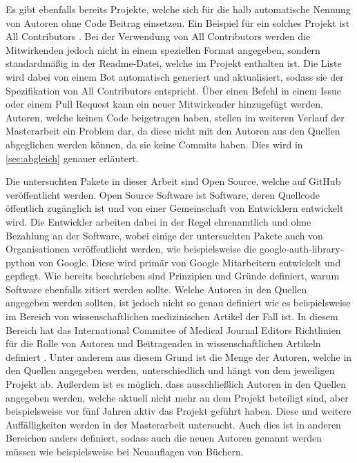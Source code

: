 Es gibt ebenfalls bereits Projekte, welche sich für die halb automatische Nennung von Autoren ohne Code Beitrag einsetzen.
Ein Beispiel für ein solches Projekt ist \glqq All Contributors\grqq{} \autocite{all_contributors_recognize_2024}.
Bei der Verwendung von \glqq All Contributors\grqq{} werden die Mitwirkenden jedoch nicht in einem speziellen Format angegeben, sondern standardmäßig in der Readme-Datei, welche im Projekt enthalten ist.
Die Liste wird dabei von einem Bot automatisch generiert und aktualisiert, sodass sie der Spezifikation von \glqq All Contributors\grqq{} entspricht.
Über einen Befehl in einem Issue oder einem Pull Request kann ein neuer Mitwirkender hinzugefügt werden.
Autoren, welche keinen Code beigetragen haben, stellen im weiteren Verlauf der Masterarbeit ein Problem dar, da diese nicht mit den Autoren aus den Quellen abgeglichen werden können, da sie keine Commits haben.
Dies wird in \autoref{sec:abgleich} genauer erläutert.

Die untersuchten Pakete in dieser Arbeit sind Open Source, welche auf GitHub veröffentlicht werden.
Open Source Software ist Software, deren Quellcode öffentlich zugänglich ist und von einer Gemeinschaft von Entwicklern entwickelt wird.
Die Entwickler arbeiten dabei in der Regel ehrenamtlich und ohne Bezahlung an der Software, wobei einige der untersuchten Pakete auch von Organisationen veröffentlicht werden, wie beispielsweise die \glqq google-auth-library-python
\grqq{} von Google.
Diese wird primär von Google Mitarbeitern entwickelt und gepflegt.
Wie bereits beschrieben sind Prinzipien und Gründe definiert, warum Software ebenfalls zitiert werden sollte.
Welche Autoren in den Quellen angegeben werden sollten, ist jedoch nicht so genau definiert wie es beispielsweise im Bereich von wissenschaftlichen medizinischen Artikel der Fall ist.
In diesem Bereich hat das \glqq International Commitee of Medical Journal Editors\grqq{} Richtlinien für die Rolle von Autoren und Beitragenden in wissenschaftlichen Artikeln definiert \autocite{noauthor_icmje_nodate}.
Unter anderem aus diesem Grund ist die Menge der Autoren, welche in den Quellen angegeben werden, unterschiedlich und hängt von dem jeweiligen Projekt ab.
Außerdem ist es möglich, dass ausschließlich Autoren in den Quellen angegeben werden, welche aktuell nicht mehr an dem Projekt beteiligt sind, aber beispielsweise vor fünf Jahren aktiv das Projekt geführt haben.
Diese und weitere Auffälligkeiten werden in der Masterarbeit untersucht.
Auch dies ist in anderen Bereichen anders definiert, sodass auch die neuen Autoren genannt werden müssen wie beispielsweise bei Neuauflagen von Büchern.
